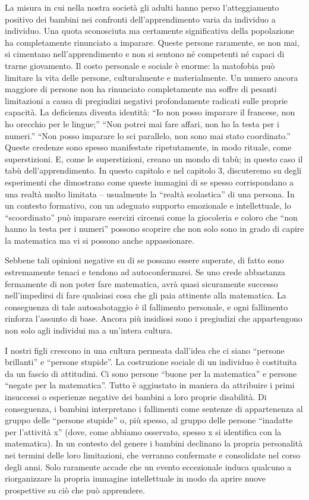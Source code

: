 La misura in cui nella nostra società gli adulti hanno perso l'atteggiamento positivo dei bambini nei confronti dell'apprendimento varia da individuo a individuo. Una quota sconosciuta ma certamente significativa della popolazione ha completamente rinunciato a imparare. Queste persone raramente, se non mai, si cimentano nell'apprendimento e non si sentono né competenti né capaci di trarne giovamento. Il costo personale e sociale è enorme: la matofobia può limitare la vita delle persone, culturalmente e materialmente. Un numero ancora maggiore di persone non ha rinunciato completamente ma soffre di pesanti limitazioni a causa di pregiudizi negativi profondamente radicati sulle proprie capacità. La deficienza diventa identità: “Io non posso imparare il francese, non ho orecchio per le lingue;” “Non potrei mai fare affari, non ho la testa per i numeri.” “Non posso imparare lo sci parallelo, non sono mai stato coordinato.” Queste credenze sono spesso manifestate ripetutamente, in modo rituale, come superstizioni. E, come le superstizioni, creano un mondo di tabù; in questo caso il tabù dell'apprendimento. In questo capitolo e nel capitolo 3, discuteremo su degli esperimenti che dimostrano come queste immagini di se spesso corrispondano a una realtà molto limitata – usualmente la “realtà scolastica” di una persona. In un contesto formativo, con un adeguato supporto emozionale e intellettuale, lo “scoordinato” può imparare esercizi circensi come la giocoleria e coloro che “non hanno la testa per i numeri” possono scoprire che non solo sono in grado di capire la matematica ma vi si possono anche appassionare.

Sebbene tali opinioni negative su di se possano essere superate, di fatto sono estremamente tenaci e tendono ad autoconfermarsi. Se uno crede abbastanza fermamente di non poter fare matematica, avrà quasi sicuramente successo nell'impedirsi di fare qualsiasi cosa che gli paia attinente alla matematica. La conseguenza di tale autosabotaggio è il fallimento personale, e ogni fallimento rinforza l'assunto di base. Ancora più insidiosi sono i pregiudizi che appartengono non solo agli individui ma a un'intera cultura.

I nostri figli crescono in una cultura permeata dall'idea che ci siano “persone brillanti” e “persone stupide”. La costruzione sociale di un individuo è costituita da un fascio di attitudini. Ci sono persone “buone per la matematica”  e persone “negate per la matematica”. Tutto è aggiustato in maniera da attribuire i primi insuccessi o esperienze negative dei bambini a loro proprie disabilità. Di conseguenza, i bambini interpretano i fallimenti come sentenze di appartenenza al gruppo delle “persone stupide” o, più spesso, al gruppo delle persone “inadatte per l'attività x” (dove, come abbiamo osservato, spesso x si identifica con la matematica). In un contesto del genere i bambini declinano la propria personalità nei termini delle loro limitazioni, che verranno confermate e consolidate nel corso degli anni. Solo raramente accade che un evento eccezionale induca qualcuno a riorganizzare la propria immagine intellettuale in modo da aprire nuove prospettive su ciò che può apprendere.

